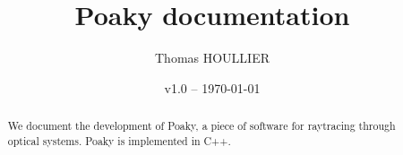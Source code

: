 \documentclass[letterpaper]{article}
\title{Poaky documentation}
\author{Thomas HOULLIER}
\begin{document}
\frenchspacing
\date{v1.0 -- \today}
\maketitle
\thispagestyle{FirstPage}

\begin{abstract}
We document the development of Poaky, a piece of software for raytracing
through optical systems. Poaky is implemented in C++.
\end{abstract}


\begin{versionhistory}
\end{versionhistory}
\setcounter{table}{0} %

\tableofcontents
\printglossary[type=\acronymtype,style=index]
\pagestyle{plain}


\appendix
\cleardoublepage


\apptocmd{\thebibliography}{\raggedright}{}{}
\begingroup
{}
\setlength\bibitemsep{0pt}
\printbibliography
\endgroup
\end{document}
